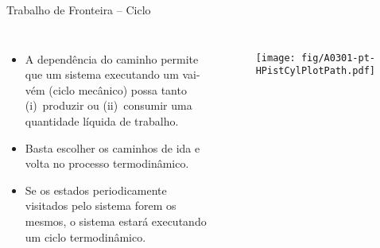     \begin{frame}{Trabalho de Fronteira -- Ciclo}\vspace*{-2em}
        \begin{columns}
        \begin{itemize}
            \small
            \item<1-> A dependência do caminho permite que um sistema executando um vai-vém
                (\alert{ciclo mecânico}) possa tanto (i)~produzir ou (ii)~consumir uma
                quantidade \alert{líquida} de trabalho. \\[\medskipamount]
            \item<2-> Basta escolher os caminhos de ida e volta no processo termodinâmico.
                \\[\medskipamount]
            \item<3-> Se os \alert{estados} periodicamente visitados pelo sistema forem
                \alert{os mesmos}, o sistema estará executando um \alert{ciclo termodinâmico}.
        \end{itemize}
            \begin{figure}
                \texttt{[image: fig/A0301-pt-HPistCylPlotPath.pdf]}
            \end{figure}
        \end{columns}
    \end{frame}

